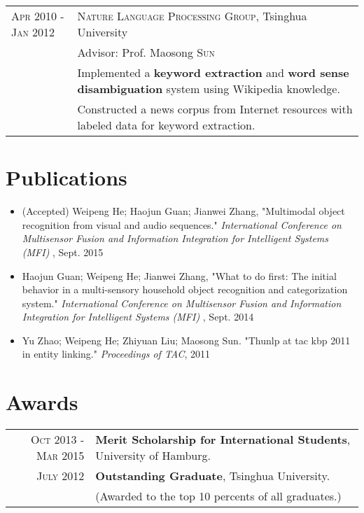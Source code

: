 \documentclass[a4paper,11pt]{article} %
\begin{document}
\begin{tabular}{R{3.5cm}|p{11cm}}

  \textsc{Apr 2010 - Jan 2012} & \textsc{Nature Language Processing Group}, Tsinghua University \\
  & {\footnotesize Advisor:} Prof. Maosong \textsc{Sun} \\
  & {\footnotesize Implemented a \textbf{keyword extraction} and \textbf{word sense disambiguation} system using Wikipedia knowledge.} \\
  & {\footnotesize Constructed a news corpus from Internet resources with labeled data for keyword extraction.} \\

\end{tabular}

\section{Publications}
\begin{itemize}
  \item (Accepted) Weipeng He; Haojun Guan; Jianwei Zhang, "Multimodal object recognition from visual and audio sequences." \textit{International Conference on Multisensor Fusion and Information Integration for Intelligent Systems (MFI)} , Sept. 2015 

  \item Haojun Guan; Weipeng He; Jianwei Zhang, "What to do first: The initial behavior in a multi-sensory household object recognition and categorization system." \textit{International Conference on Multisensor Fusion and Information Integration for Intelligent Systems (MFI)} , Sept. 2014

  \item Yu Zhao; Weipeng He; Zhiyuan Liu; Maosong Sun. "Thunlp at tac kbp 2011 in entity linking." \textit{Proceedings of TAC}, 2011
\end{itemize}


\section{Awards}

\begin{tabular}{rl}
  \textsc{Oct 2013 - Mar 2015} & \textbf{Merit Scholarship for International Students}, {\small University of Hamburg}. \\
  \textsc{July 2012} & \textbf{Outstanding Graduate}, {\small Tsinghua University}. \\
  & {\footnotesize (Awarded to the top 10 percents of all graduates.)}

\end{tabular}
\end{document}
